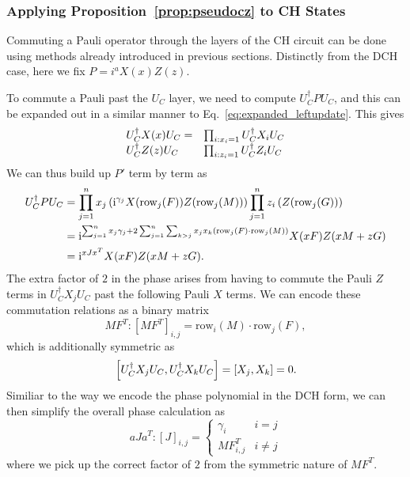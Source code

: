 \subsubsection*{Applying Proposition~\ref{prop:pseudocz} to CH States}
Commuting a Pauli operator through the layers of the CH circuit can be done using methods already introduced in previous sections. Distinctly from the DCH case, here we fix $P=i^{a}X(x)Z(z)$.\par
To commute a Pauli past the $U_{C}$ layer, we need to compute $U_{C}^{\dagger}PU_{C}$, and this can be expanded out in a similar manner to Eq.~\ref{eq:expanded_leftupdate}. This gives
\[
\begin{array}{l l}
U_{C}^{\dagger}X(x)U_{C} = & \prod_{i:x_{i}=1}U_{C}^{\dagger}X_{i}U_{C}\\
U_{C}^{\dagger}Z(z)U_{C} & \prod_{i:z_{i}=1}U_{C}^{\dagger}Z_{i}U_{C}
\end{array}
\]
We can thus build up $P'$ term by term as
\begin{align}
U_{C}^{\dagger}PU_{C} &= \prod_{j=1}^{n}x_{j}\left(\mathrm{i}^{\gamma_{j}}X(\text{row}_{j}(F))Z(\text{row}_{j}(M))\right)\prod_{j=1}^{n}z_{i}\left(Z(\text{row}_{j}(G))\right) \nonumber \\
&= \mathrm{i}^{\sum_{j=1}^{n} x_{j}\gamma_{j} + 2\sum_{j=1}^{n}\sum_{k>j}x_{j}x_{k}\left( \text{row}_{j}(F)\cdot\text{row}_{j}(M) \right)}X(xF)Z(xM+zG) \nonumber \\
&= \mathrm{i}^{xJx^{T}}X(xF)Z(xM+zG).
\label{eq:tableau_update_pauli}
\end{align}
The extra factor of $2$ in the phase arises from having to commute the Pauli $Z$ terms in $U_{C}^{\dagger}X_{j}U_{C}$ past the following Pauli $X$ terms. We can encode these commutation relations as a binary matrix
\[MF^{T} : \left[MF^{T}\right]_{i,j} = \text{row}_{i}(M)\cdot \text{row}_{j}(F),\]
which is additionally symmetric as 
\[\comm{U_{C}^{\dagger}X_{j}U_{C}}{U_{C}^{\dagger}X_{k}U_{C}} = \comm{X_{j}}{X_{k}} = 0.\]
Similiar to the way we encode the phase polynomial in the DCH form, we can then simplify the overall phase calculation as
\[aJa^{T} : \left[J\right]_{i,j} = \begin{cases} \gamma_{i} & i=j \\ MF^{T}_{i,j} & i\neq j \end{cases}\]
where we pick up the correct factor of $2$ from the symmetric nature of $MF^{T}$.

